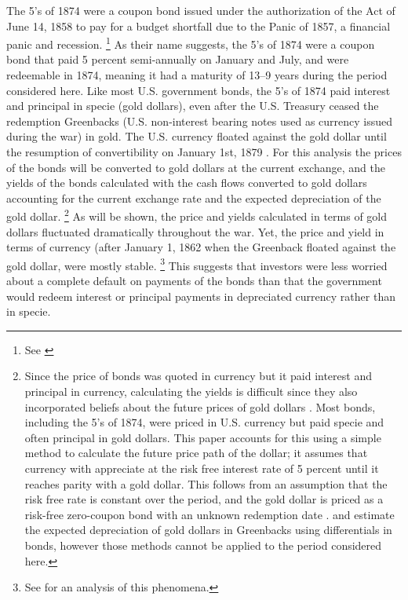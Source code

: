 The 5's of 1874 were a coupon bond issued under the authorization of the Act of June 14, 1858 to pay for a budget shortfall due to the Panic of 1857, a financial panic and recession.%
\footnote{
  See \textcites[p. 76]{Bayley1882}[78--79]{DeKnight1900}[42-43]{Treasury1863}[300-301, 305]{HomerSylla2005}
}
As their name suggests, the 5's of 1874 were a coupon bond that paid 5 percent semi-annually on January and July, and were redeemable in 1874, meaning it had a maturity of 13--9 years during the period considered here.
Like most U.S. government bonds, the 5's of 1874 paid interest and principal in specie (gold dollars), even after the U.S. Treasury ceased the redemption Greenbacks (U.S. non-interest bearing notes used as currency issued during the war) in gold.
The U.S. currency floated against the gold dollar until the resumption of convertibility on January 1st, 1879 \parencites{Dewey1918}{WillardGuinnaneEtAl1996}.
For this analysis the prices of the bonds will be converted to gold dollars at the current exchange, and the yields of the bonds calculated with the cash flows converted to gold dollars accounting for the current exchange rate and the expected depreciation of the gold dollar.%
\footnote{
  Since the price of bonds was quoted in currency but it paid interest and principal in currency, calculating the yields is difficult since they also incorporated beliefs about the future prices of gold dollars \parencites[Appendix A]{Macaulay1938}{Roll1972}{Calomiris1988}[302-303]{HomerSylla2005}.
  Most bonds, including the 5's of 1874, were priced in U.S. currency but paid specie and often principal in gold dollars.
  This paper accounts for this using a simple method to calculate the future price path of the dollar; it assumes that currency with appreciate at the risk free interest rate of 5 percent until it reaches parity with a gold dollar.
  This follows from an assumption that the risk free rate is constant over the period, and the gold dollar is priced as a risk-free zero-coupon bond with an unknown redemption date \cite{McCandless1996}.
  \textcite{Roll1972} and \textcite{Calomiris1988} estimate the expected depreciation of gold dollars in Greenbacks using differentials in bonds, however those methods cannot be applied to the period considered here.
}
As will be shown, the price and yields calculated in terms of gold dollars fluctuated dramatically throughout the war.
Yet, the price and yield in terms of currency (after January 1, 1862 when the Greenback floated against the gold dollar, were mostly stable.%
\footnote{See \textcite{Roll1972} for an analysis of this phenomena.}
This suggests that investors were less worried about a complete default on payments of the bonds than that the government would redeem interest or principal payments in depreciated currency rather than in specie.

